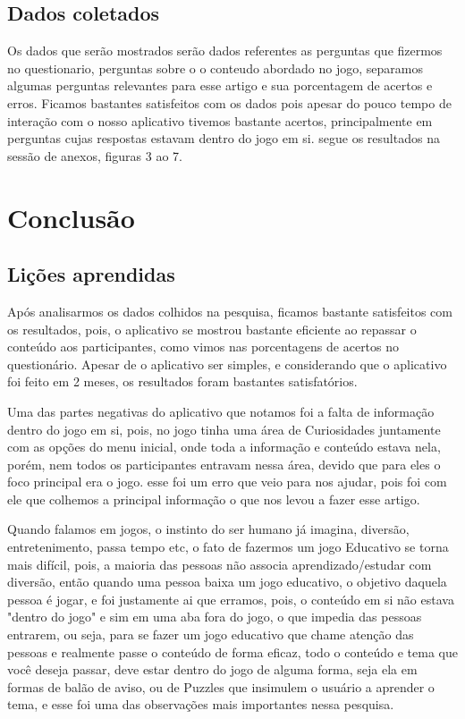 \documentclass[12pt]{article}
\begin{document}
		
		
		
	\subsection{Dados coletados} %
		Os dados que serão mostrados serão dados referentes as perguntas que fizermos no questionario, perguntas sobre o  o conteudo abordado no jogo, separamos algumas perguntas relevantes para esse artigo e sua porcentagem de acertos e erros. Ficamos bastantes satisfeitos com os dados pois apesar do pouco tempo de interação com o nosso aplicativo tivemos bastante acertos, principalmente em perguntas cujas respostas estavam dentro do jogo em si. segue os resultados na sessão de anexos, figuras 3 ao 7. 
	
	
	\section{Conclusão}%
	\subsection{Lições aprendidas}
		Após analisarmos os dados colhidos na pesquisa, ficamos bastante satisfeitos com os resultados, pois, o aplicativo se mostrou bastante eficiente ao repassar o conteúdo aos participantes, como vimos nas porcentagens de acertos no questionário. Apesar de o aplicativo ser simples, e considerando que o aplicativo foi feito em 2 meses, os resultados foram bastantes satisfatórios.
		
		Uma das partes negativas do aplicativo que notamos foi a falta de informação dentro do jogo em si, pois, no jogo tinha uma área de Curiosidades juntamente com as opções do menu inicial, onde toda a informação e conteúdo estava nela, porém, nem todos os participantes entravam nessa área, devido que para eles o foco principal era o jogo. esse foi um erro que veio para nos ajudar, pois foi com ele que colhemos a principal informação o que nos levou a fazer esse artigo.
		
		Quando falamos em jogos, o instinto do ser humano já imagina, diversão, entretenimento, passa tempo etc, o fato de fazermos um jogo Educativo se torna mais difícil, pois, a maioria das pessoas não associa aprendizado/estudar com diversão, então quando uma pessoa baixa um jogo educativo, o objetivo daquela pessoa é jogar, e foi justamente ai que erramos, pois, o conteúdo em si não estava "dentro do jogo" e sim em uma aba fora do jogo, o que impedia das pessoas entrarem, ou seja, para se fazer um jogo educativo que chame atenção das pessoas e realmente passe o conteúdo de forma eficaz, todo o conteúdo e tema que você deseja passar, deve estar dentro do jogo de alguma forma, seja ela em formas de balão de aviso, ou de Puzzles que insimulem o usuário a aprender o tema, e esse foi uma das observações mais importantes nessa pesquisa.
	
\end{document}
